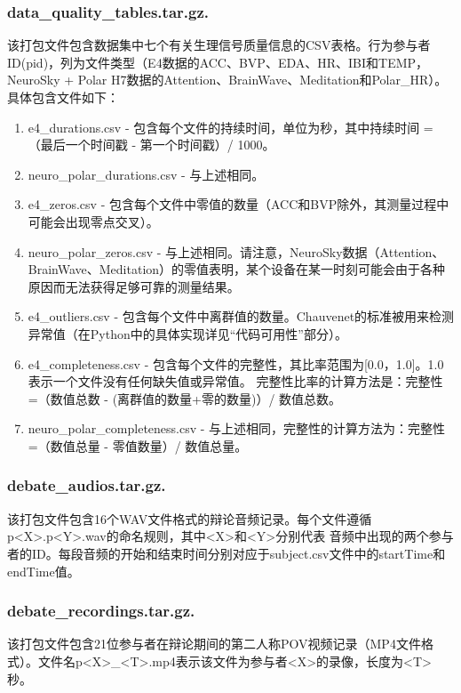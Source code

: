 \subsubsection{data\_quality\_tables.tar.gz.}
该打包文件包含数据集中七个有关生理信号质量信息的CSV表格。行为参与者ID(pid)，列为文件类型（E4数据的ACC、BVP、EDA、HR、IBI和TEMP，NeuroSky + Polar 
H7数据的Attention、BrainWave、Meditation和Polar\_HR）。具体包含文件如下：
\begin{enumerate}
    \item e4\_durations.csv - 包含每个文件的持续时间，单位为秒，其中持续时间 =（最后一个时间戳 - 第一个时间戳）/ 1000。
    \item neuro\_polar\_durations.csv - 与上述相同。
    \item e4\_zeros.csv - 包含每个文件中零值的数量（ACC和BVP除外，其测量过程中可能会出现零点交叉）。
    \item neuro\_polar\_zeros.csv - 与上述相同。请注意，NeuroSky数据（Attention、BrainWave、Meditation）的零值表明，某个设备在某一时刻可能会由于各种原因而无法获得足够可靠的测量结果。
    \item e4\_outliers.csv - 包含每个文件中离群值的数量。Chauvenet的标准被用来检测异常值（在Python中的具体实现详见“代码可用性”部分）。
    \item e4\_completeness.csv - 包含每个文件的完整性，其比率范围为[0.0，1.0]。1.0表示一个文件没有任何缺失值或异常值。
    完整性比率的计算方法是：完整性 =（数值总数 - (离群值的数量+零的数量)）/ 数值总数。
    \item neuro\_polar\_completeness.csv - 与上述相同，完整性的计算方法为：完整性 =（数值总量 - 零值数量）/ 数值总量。
\end{enumerate}

\subsubsection{debate\_audios.tar.gz.}
该打包文件包含16个WAV文件格式的辩论音频记录。每个文件遵循p<X>.p<Y>.wav的命名规则，其中<X>和<Y>分别代表
音频中出现的两个参与者的ID。每段音频的开始和结束时间分别对应于subject.csv文件中的startTime和endTime值。 

\subsubsection{debate\_recordings.tar.gz.}
该打包文件包含21位参与者在辩论期间的第二人称POV视频记录（MP4文件格式）。文件名p<X>\_<T>.mp4表示该文件为参与者<X>的录像，长度为<T>秒。

